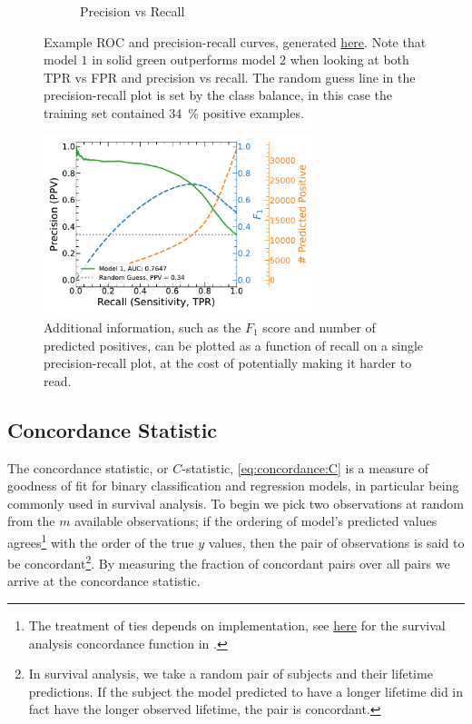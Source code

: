 \begin{figure}
\begin{subfigure}[c]{0.48\textwidth}
  \caption{Precision vs Recall}
  \label{fig:ml:roc:precision_recall}
  \end{subfigure}
\caption{
Example ROC and precision-recall curves, generated \href{https://github.com/mepland/data_science_notes/blob/main/plots/plots.ipynb}{here}.
Note that model $1$ in solid green outperforms model $2$ when looking at both TPR vs FPR and precision vs recall.
The random guess line in the precision-recall plot is set by the class balance,
in this case the training set contained \SI{34}{\percent} positive examples.
}
\label{fig:ml:roc}
\end{figure}

\begin{figure}
  \centering
  \includegraphics[width=0.7\textwidth,trim={0.18cm 0.3cm 0.18cm 0.3cm}]{figures/ml/roc_curves/roc_precision_recall_model_1_f1_n_pos}%
\caption{
Additional information, such as the $F_{1}$ score and number of predicted positives,
can be plotted as a function of recall on a single precision-recall plot,
at the cost of potentially making it harder to read.
}
\label{fig:ml:roc:precision_recall:extended}
\end{figure}

\subsection{Concordance Statistic}
\label{ml_general:eval:concordance}

The concordance statistic, or $C$-statistic, \cref{eq:concordance:C} is a measure of goodness of fit
for binary classification and regression models, in particular being commonly used in survival analysis.
To begin we pick two observations at random from the $m$ available observations;
if the ordering of model's predicted \yhat values agrees\footnote{The treatment of ties depends on implementation,
see \href{https://cran.r-project.org/web/packages/survival/vignettes/concordance.pdf}{here}
for the survival analysis concordance function in \R.} with the order of the true $y$ values,
then the pair of observations is said to be concordant\footnote{In survival analysis,
we take a random pair of subjects and their lifetime predictions.
If the subject the model predicted to have a longer lifetime
did in fact have the longer observed lifetime, the pair is concordant.}.
By measuring the fraction of concordant pairs over all pairs we arrive at the concordance statistic.

